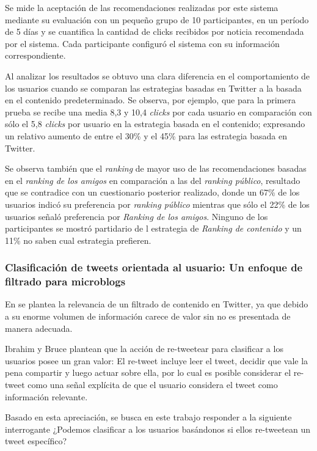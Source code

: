    Se mide la aceptación de las recomendaciones realizadas por este sistema mediante su evaluación con 
   un pequeño grupo de 10 participantes, en un período de 5 días y se cuantifica la cantidad de clicks recibidos por noticia recomendada por el sistema. 
   Cada participante configuró el sistema con su información correspondiente.

	Al analizar los resultados se obtuvo una clara diferencia en el comportamiento de los usuarios cuando se comparan 
	las estrategias basadas en Twitter a la basada en el contenido predeterminado. Se observa, por ejemplo, que para la primera prueba se recibe una media 8,3 y 10,4 \emph{clicks} por cada usuario en comparación con sólo el 5,8 \emph{clicks} por usuario en la estrategia basada en el contenido; expresando un relativo aumento de entre el 30\% y el 45\% para las estrategia basada en Twitter.

	Se observa también que el \emph{ranking} de mayor uso de las recomendaciones basadas en el \emph{ranking de los amigos} en comparación a las del \emph{ranking público}, resultado que se contradice con un cuestionario posterior realizado, donde un 67\% de los usuarios indicó su preferencia por \emph{ranking público} mientras que sólo el 22\% de los usuarios señaló preferencia por \emph{Ranking de los amigos}. Ninguno de los participantes se mostró partidario de l estrategia de \emph{Ranking de contenido} y un 11\% no saben cual estrategia prefieren.

\subsubsection{Clasificación de tweets orientada al usuario: Un enfoque de filtrado para microblogs}

En \cite{conf/cikm/UysalC11} se plantea la relevancia de un filtrado de contenido en Twitter, ya que debido a su enorme volumen de información carece de valor sin no es presentada de manera adecuada. 

Ibrahim y Bruce plantean que la acción de re-tweetear para clasificar a los usuarios posee un gran valor: El re-tweet incluye leer el tweet, decidir que vale la pena compartir y luego actuar sobre ella, por lo cual es posible considerar el re-tweet como una señal explícita de que el usuario considera el tweet como información relevante. 

Basado en esta apreciación, se busca en este trabajo responder a la siguiente interrogante ¿Podemos clasificar a los usuarios basándonos si ellos re-tweetean un tweet específico?

